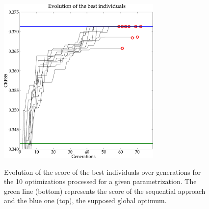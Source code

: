 \documentclass[twocol]{ametsoc}
\begin{document}
\begin{figure}[htb]
	\begin{center}
		\noindent\includegraphics[width=19pc,angle=0]{figures/gas_evolution_good.pdf}\\
	\end{center}
	\caption{Evolution of the score of the best individuals over generations for the 10 optimizations processed for a given parametrization. The green line (bottom) represents the score of the sequential approach and the blue one (top), the supposed global optimum.}
	\label{fig:gas_evolution_good}
\end{figure}
\end{document}
